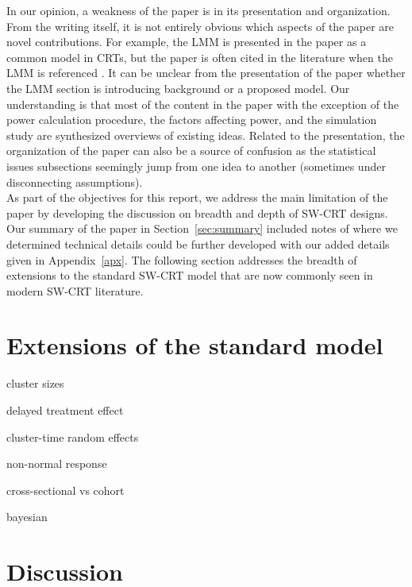 \documentclass[10pt]{article}
\begin{document}
In our opinion, a weakness of the paper is in its presentation and organization. From the writing itself, it is not entirely obvious which aspects of the paper are novel contributions. For example, the LMM is presented in the paper as a common model in CRTs, but the paper is often cited in the literature when the LMM is referenced \parencite[e.g.,][]{Harrison:2020,Bowden:2021,DavisPlourde:2021}. It can be unclear from the presentation of the paper whether the LMM section is introducing background or a proposed model. Our understanding is that most of the content in the paper with the exception of the power calculation procedure, the factors affecting power, and the simulation study are synthesized overviews of existing ideas. Related to the presentation, the organization of the paper can also be a source of confusion as the statistical issues subsections seemingly jump from one idea to another (sometimes under disconnecting assumptions).
\\

As part of the objectives for this report, we address the main limitation of the paper by developing the discussion on breadth and depth of SW-CRT designs. Our summary of the paper in Section~\ref{sec:summary} included notes of where we determined technical details could be further developed with our added details given in Appendix~\ref{apx}. The following section addresses the breadth of extensions to the standard SW-CRT model that are now commonly seen in modern SW-CRT literature.


\section{Extensions of the standard model} \label{sec:extension}

\todo

cluster sizes

delayed treatment effect

cluster-time random effects

non-normal response

cross-sectional vs cohort

bayesian


\section{Discussion} \label{sec:discussion}


\newpage


\printbibliography
\end{document}

